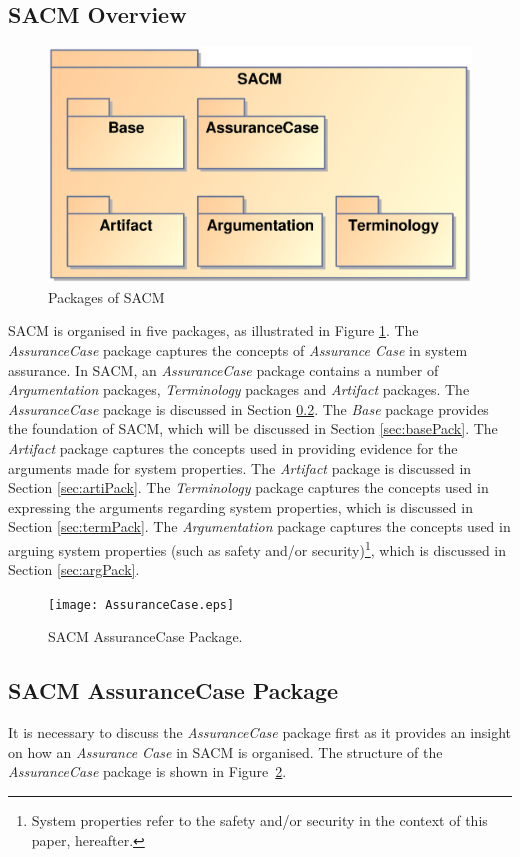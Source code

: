\subsection{SACM Overview}
\begin{figure}
	\centering
	\includegraphics[width=0.6\linewidth]{Overview.eps}
	\caption{Packages of SACM}
	\label{fig:overview}
\end{figure}
SACM is organised in five packages, as illustrated in Figure \ref{fig:overview}. 
The \textit{AssuranceCase} package captures the concepts of \textit{Assurance Case} in system assurance.
In SACM, an \textit{AssuranceCase} package contains a number of \textit{Argumentation} packages, \textit{Terminology} packages and \textit{Artifact} packages.
The \textit{AssuranceCase} package is discussed in Section \ref{sec:acPack}.
The \textit{Base} package provides the foundation of SACM, which will be discussed in Section \ref{sec:basePack}.
The \textit{Artifact} package captures the concepts used in providing evidence for the arguments made for system properties. 
The \textit{Artifact} package is discussed in Section \ref{sec:artiPack}. 
The \textit{Terminology} package captures the concepts used in expressing the arguments regarding system properties, which is discussed in Section \ref{sec:termPack}. 
The \textit{Argumentation} package captures the concepts used in arguing system properties (such as safety and/or security)\footnote{System properties refer to the safety and/or security in the context of this paper, hereafter.}, which is discussed in Section \ref{sec:argPack}.
 
\begin{figure}
	\centering
	\texttt{[image: AssuranceCase.eps]}
	\caption{SACM AssuranceCase Package.}
	\label{fig:ac}
\end{figure}
\subsection{SACM AssuranceCase Package}
\label{sec:acPack}

It is necessary to discuss the \textit{AssuranceCase} package first as it provides an insight on how an \textit{Assurance Case} in SACM is organised. 
The structure of the \textit{AssuranceCase} package is shown in Figure~\ref{fig:ac}.



